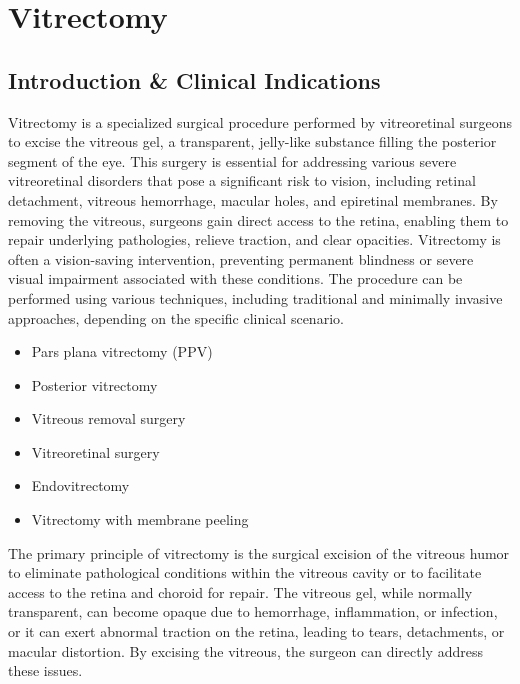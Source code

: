 \chapter{Vitrectomy}

\section*{Introduction \& Clinical Indications}
Vitrectomy is a specialized surgical procedure performed by vitreoretinal surgeons to excise the vitreous gel, a transparent, jelly-like substance filling the posterior segment of the eye. This surgery is essential for addressing various severe vitreoretinal disorders that pose a significant risk to vision, including retinal detachment, vitreous hemorrhage, macular holes, and epiretinal membranes. By removing the vitreous, surgeons gain direct access to the retina, enabling them to repair underlying pathologies, relieve traction, and clear opacities. Vitrectomy is often a vision-saving intervention, preventing permanent blindness or severe visual impairment associated with these conditions. The procedure can be performed using various techniques, including traditional and minimally invasive approaches, depending on the specific clinical scenario.

\begin{itemize}
  \item Pars plana vitrectomy (PPV)
  \item Posterior vitrectomy
  \item Vitreous removal surgery
  \item Vitreoretinal surgery
  \item Endovitrectomy
  \item Vitrectomy with membrane peeling
\end{itemize}

The primary principle of vitrectomy is the surgical excision of the vitreous humor to eliminate pathological conditions within the vitreous cavity or to facilitate access to the retina and choroid for repair. The vitreous gel, while normally transparent, can become opaque due to hemorrhage, inflammation, or infection, or it can exert abnormal traction on the retina, leading to tears, detachments, or macular distortion. By excising the vitreous, the surgeon can directly address these issues.

